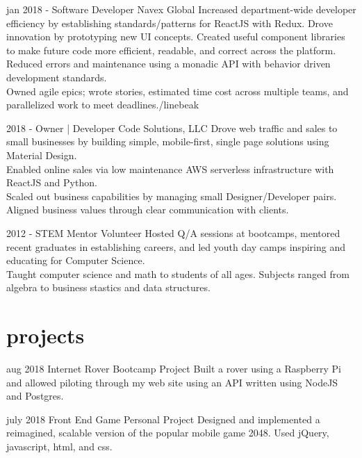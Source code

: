\documentclass[]{friggeri-cv}
\begin{document}
\begin{entrylist}
  \entry 
    {jan 2018 -}
    {Software Developer}
    {Navex Global}
    {Increased department-wide developer efficiency by establishing standards/patterns for ReactJS with Redux. Drove innovation by prototyping new UI concepts. Created useful component libraries to make future code more efficient, readable, and correct across the platform.\\
    Reduced errors and maintenance using a monadic API with behavior driven development standards.\\
    Owned agile epics; wrote stories, estimated time cost across multiple teams, and parallelized work to meet deadlines./linebeak
    }
  
  \entry 
    {2018 - }
    {Owner | Developer}
    {Code Solutions, LLC}
    {Drove web traffic and sales to small businesses by building simple, mobile-first, single page solutions using Material Design. \\
    Enabled online sales via low maintenance AWS serverless infrastructure with ReactJS and Python. \\
    Scaled out business capabilities by managing small Designer/Developer pairs. Aligned business values through clear communication with clients.}

 
  \entry
    {2012 -}
    {STEM Mentor Volunteer}
    {}
    {Hosted Q/A sessions at bootcamps, mentored recent graduates in establishing careers, and led youth day camps inspiring and educating for Computer Science.\\
    Taught computer science and math to students of all ages. Subjects ranged from algebra to business stastics and data structures.}

%
  

\end{entrylist}

\section{projects}

\begin{entrylist}

  \entry
    {aug 2018}
    {Internet Rover}
    {Bootcamp Project}
    {Built a rover using a Raspberry Pi and allowed piloting through my web site using an API written using NodeJS and Postgres.}

  \entry
    {july 2018}
    {Front End Game}
    {Personal Project}
    {Designed and implemented a reimagined, scalable version of the popular mobile game 2048. Used jQuery, javascript, html, and css.}

\end{entrylist}
\end{document}
